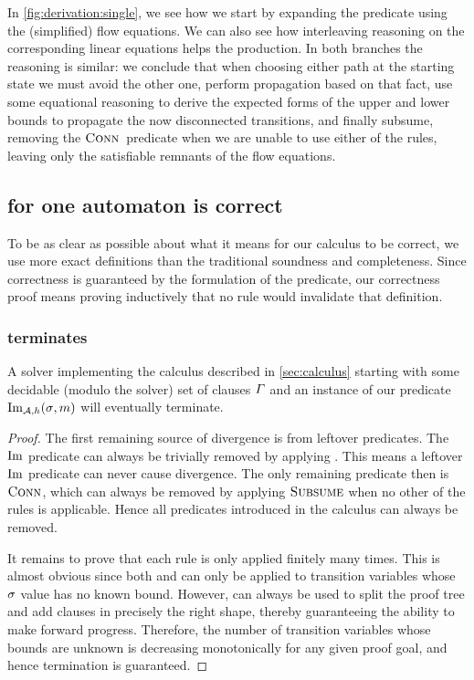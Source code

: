 \documentclass[acmsmall,review,anonymous,screen]{acmart}\settopmatter{printfolios=true,printccs=false,printacmref=true}
\theoremstyle{definition}
\begin{document}
In \cref{fig:derivation:single}, we see how we start by expanding the predicate
using the (simplified) flow equations. We can also see how interleaving
reasoning on the corresponding linear equations helps the production. In both
branches the reasoning is similar: we conclude that when choosing either path at
the starting state we must avoid the other one, perform propagation based on
that fact, use some equational reasoning to derive the expected forms of the
upper and lower bounds to propagate the now disconnected transitions, and
finally subsume, removing the $\operatorname{\textsc{Conn}}{}$ predicate when we are unable to use
either of the rules, leaving only the satisfiable remnants of the flow
equations.

\subsection{\Calculus{} for one automaton is correct}\label{sec:single:correct}

To be as clear as possible about what it means for our calculus to be correct,
we use more exact definitions than the traditional soundness and completeness.
Since correctness is guaranteed by the formulation of the predicate, our
correctness proof means proving inductively that no rule would invalidate that
definition.

\subsubsection{\Calculus{} terminates}
\begin{lemma}\label{lma:single-terminates}
  A solver implementing the calculus described in \cref{sec:calculus} starting
  with some decidable (modulo the solver) set of clauses $\varGamma{}$ and an
  instance of our predicate $\operatorname{Im}_{\mathcal{A}, h}(\operatorname{\sigma}, m)$ will eventually
  terminate.
\end{lemma}

\begin{proof}
The first remaining source of divergence is from leftover predicates. The
$\operatorname{Im}$ predicate can always be trivially removed by applying \Expand{}. This
means a leftover $\operatorname{Im}$ predicate can never cause divergence. The only
remaining predicate then is $\operatorname{\textsc{Conn}}$, which can always be removed by
applying $\textsc{Subsume}$ when no other of the rules is applicable. Hence all
predicates introduced in the calculus can always be removed.

It remains to prove that each rule is only applied finitely many times. This is
almost obvious since both \Propagate{} and \Split{} can only be applied to
transition variables whose $\operatorname{\sigma}$ value has no known bound. However, \Split{}
can always be used to split the proof tree and add clauses in precisely the
right shape, thereby guaranteeing the ability to make forward progress.
Therefore, the number of transition variables whose bounds are unknown is
decreasing monotonically for any given proof goal, and hence termination is
guaranteed.
\end{proof}
\end{document}
